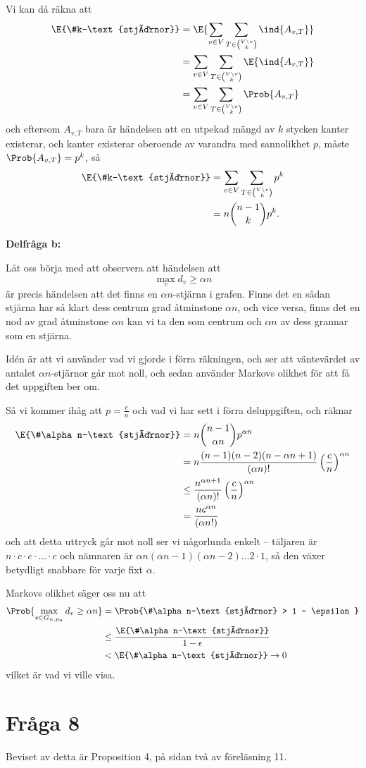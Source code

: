 \documentclass[nobib]{tufte-handout}
\begin{document}
Vi kan då räkna att
\begin{align*}
  \E{\#k-\text{stjärnor}} &= \E{\sum_{v\in V}\sum_{T \in \binom{V\setminus v}{k}} \ind{A_{v,T}}}\\
  &= \sum_{v\in V}\sum_{T \in \binom{V\setminus v}{k}} \E{\ind{A_{v,T}}}\\
  &= \sum_{v\in V}\sum_{T \in \binom{V\setminus v}{k}} \Prob{A_{v,T}}
\end{align*}
och eftersom $A_{v,T}$ bara är händelsen att en utpekad mängd av $k$ stycken kanter existerar, och kanter existerar oberoende av varandra med sannolikhet $p$, måste $\Prob{A_{v,T}} = p^k$, så
\begin{align*}
  \E{\#k-\text{stjärnor}} &= \sum_{v\in V}\sum_{T \in \binom{V\setminus v}{k}} p^k\\
  &= n\binom{n-1}{k}p^k.
\end{align*}

\noindent\textbf{Delfråga b:}

Låt oss börja med att observera att händelsen att
$$\max_v d_v \geq \alpha n$$
är precis händelsen att det finns en $\alpha n$-stjärna i grafen. Finns det en sådan stjärna har så klart dess centrum grad åtminstone $\alpha n$, och vice versa, finns det en nod av grad åtminstone $\alpha n$ kan vi ta den som centrum och $\alpha n$ av dess grannar som en stjärna.

Idén är att vi använder vad vi gjorde i förra räkningen, och ser att väntevärdet av antalet $\alpha n$-stjärnor går mot noll, och sedan använder Markovs olikhet för att få det uppgiften ber om.

Så vi kommer ihåg att $p = \frac{c}{n}$ och vad vi har sett i förra deluppgiften, och räknar
\begin{align*}
  \E{\#\alpha n-\text{stjärnor}} &= n \binom{n-1}{\alpha n}p^{\alpha n}\\
  &= n \frac{(n-1)(n-2)(n - \alpha n + 1)}{(\alpha n)!} \left(\frac{c}{n}\right)^{\alpha n}\\
  &\leq \frac{n^{\alpha n + 1}}{(\alpha n)!}\left(\frac{c}{n}\right)^{\alpha n}\\
  &= \frac{n c^{\alpha n}}{(\alpha n!)}
\end{align*}
och att detta uttryck går mot noll ser vi någorlunda enkelt -- täljaren är $n\cdot c \cdot c\cdot\ldots\cdot c$ och nämnaren är $\alpha n(\alpha n - 1)(\alpha n - 2)\ldots2\cdot1$, så den växer betydligt snabbare för varje fixt $\alpha$.

Markovs olikhet säger oss nu att
\begin{align*}
  \Prob{\max_{v \in G_{n,p_n}} d_v \geq \alpha n} &= \Prob{\#\alpha n-\text{stjärnor} > 1 - \epsilon}\\
  &\leq \frac{\E{\#\alpha n-\text{stjärnor}}}{1 - \epsilon}\\
  &< \E{\#\alpha n-\text{stjärnor}} \to 0
\end{align*}
vilket är vad vi ville visa.

\section{Fråga 8}

Beviset av detta är Proposition 4, på sidan två av föreläsning 11.

%
%
\end{document}
